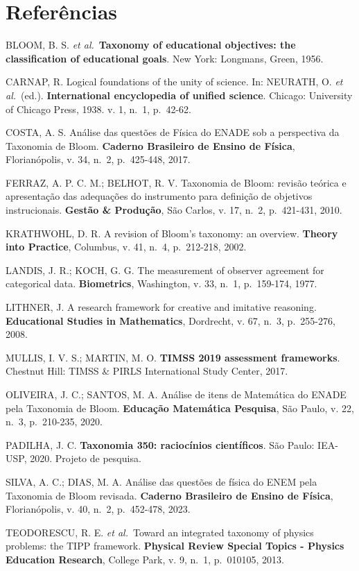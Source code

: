 \documentclass[
  12pt,
  a4paper,
  twoside,
  brazilian
]{article}
\begin{document}
\newpage
\section*{Referências}\label{referuxeancias}

BLOOM, B. S. \textit{et al.}~\textbf{Taxonomy of educational objectives: the
classification of educational goals}. New York: Longmans, Green, 1956.

CARNAP, R. Logical foundations of the unity of science. In: NEURATH, O.
\textit{et al.}~(ed.). \textbf{International encyclopedia of unified science}.
Chicago: University of Chicago Press, 1938. v. 1, n.~1, p.~42-62.

COSTA, A. S. Análise das questões de Física do ENADE sob a perspectiva
da Taxonomia de Bloom. \textbf{Caderno Brasileiro de Ensino de Física},
Florianópolis, v. 34, n.~2, p.~425-448, 2017.

FERRAZ, A. P. C. M.; BELHOT, R. V. Taxonomia de Bloom: revisão teórica e
apresentação das adequações do instrumento para definição de objetivos
instrucionais. \textbf{Gestão \& Produção}, São Carlos, v. 17, n.~2,
p.~421-431, 2010.

KRATHWOHL, D. R. A revision of Bloom's taxonomy: an overview.
\textbf{Theory into Practice}, Columbus, v. 41, n.~4, p.~212-218, 2002.

LANDIS, J. R.; KOCH, G. G. The measurement of observer agreement for
categorical data. \textbf{Biometrics}, Washington, v. 33, n.~1,
p.~159-174, 1977.

LITHNER, J. A research framework for creative and imitative reasoning.
\textbf{Educational Studies in Mathematics}, Dordrecht, v. 67, n.~3,
p.~255-276, 2008.

MULLIS, I. V. S.; MARTIN, M. O. \textbf{TIMSS 2019 assessment
frameworks}. Chestnut Hill: TIMSS \& PIRLS International Study Center,
2017.

OLIVEIRA, J. C.; SANTOS, M. A. Análise de itens de Matemática do ENADE
pela Taxonomia de Bloom. \textbf{Educação Matemática Pesquisa}, São
Paulo, v. 22, n.~3, p.~210-235, 2020.

PADILHA, J. C. \textbf{Taxonomia 350: raciocínios científicos}. São
Paulo: IEA-USP, 2020. Projeto de pesquisa.

SILVA, A. C.; DIAS, M. A. Análise das questões de física do ENEM pela
Taxonomia de Bloom revisada. \textbf{Caderno Brasileiro de Ensino de
Física}, Florianópolis, v. 40, n.~2, p.~452-478, 2023.

TEODORESCU, R. E. \textit{et al.}~Toward an integrated taxonomy of physics
problems: the TIPP framework. \textbf{Physical Review Special Topics -
Physics Education Research}, College Park, v. 9, n.~1, p.~010105, 2013.
\end{document}
